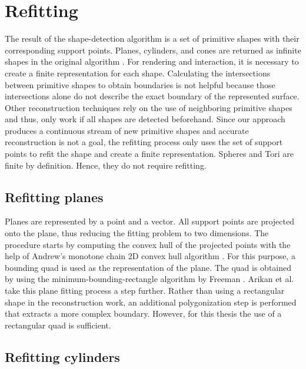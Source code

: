 \section{Refitting}
\label{sec:Refitting}

The result of the shape-detection algorithm is a set of primitive shapes with their corresponding support points. Planes, cylinders, and cones are returned as infinite shapes in the original algorithm \cite{schnabel-2007-efficient}. For rendering and interaction, it is necessary to create a finite representation for each shape. Calculating the intersections between primitive shapes to obtain boundaries is not helpful because those intersections alone do not describe the exact boundary of the represented surface. Other reconstruction techniques \cite{jenke2008surface, schnabel-2009-completion} rely on the use of neighboring primitive shapes and thus, only work if all shapes are detected beforehand. Since our approach produces a continuous stream of new primitive shapes and accurate reconstruction is not a goal, the refitting process only uses the set of support points to refit the shape and create a finite representation. Spheres and Tori are finite by definition. Hence, they do not require refitting. 


\subsection{Refitting planes}

Planes are represented by a point and a vector. All support points are projected onto the plane, thus reducing the fitting problem to two dimensions. The procedure starts by computing the convex hull of the projected points with the help of Andrew's monotone chain 2D convex hull algorithm \cite{andrew1979another}. 
For this purpose, a bounding quad is used as the representation of the plane. The quad is obtained by using the minimum-bounding-rectangle algorithm by Freeman \cite{freeman1975determining}. Arikan et al. \cite{arikan-2013-osn} take this plane fitting process a step further. Rather than using a rectangular shape in the reconstruction work, an additional polygonization step is performed that extracts a more complex boundary. However, for this thesis the use of a rectangular quad is sufficient.  


\subsection{Refitting cylinders}

